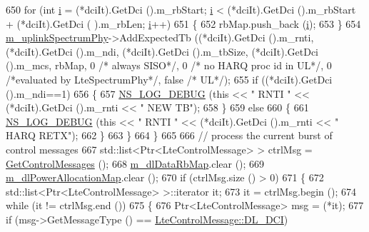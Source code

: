 \begin{DoxyCode}
650           \textcolor{keywordflow}{for} (\textcolor{keywordtype}{int} \hyperlink{bernuolliDistribution_8m_a6f6ccfcf58b31cb6412107d9d5281426}{i} = (*dciIt).GetDci ().m\_rbStart; \hyperlink{bernuolliDistribution_8m_a6f6ccfcf58b31cb6412107d9d5281426}{i} < (*dciIt).GetDci ().m\_rbStart + (*dciIt).GetDci (
      ).m\_rbLen; \hyperlink{bernuolliDistribution_8m_a6f6ccfcf58b31cb6412107d9d5281426}{i}++)
651             \{
652               rbMap.push\_back (\hyperlink{bernuolliDistribution_8m_a6f6ccfcf58b31cb6412107d9d5281426}{i});
653             \}
654           \hyperlink{classns3_1_1LtePhy_addc3110b5a1f7b63c52f4ce8ca59c6cd}{m\_uplinkSpectrumPhy}->AddExpectedTb ((*dciIt).GetDci ().m\_rnti, (*dciIt).GetDci
       ().m\_ndi, (*dciIt).GetDci ().m\_tbSize, (*dciIt).GetDci ().m\_mcs, rbMap, 0 \textcolor{comment}{/* always SISO*/}, 0 \textcolor{comment}{/* no HARQ
       proc id in UL*/}, 0 \textcolor{comment}{/*evaluated by LteSpectrumPhy*/}, \textcolor{keyword}{false} \textcolor{comment}{/* UL*/});
655           \textcolor{keywordflow}{if} ((*dciIt).GetDci ().m\_ndi==1)
656             \{
657               \hyperlink{group__logging_ga413f1886406d49f59a6a0a89b77b4d0a}{NS\_LOG\_DEBUG} (\textcolor{keyword}{this} << \textcolor{stringliteral}{" RNTI "} << (*dciIt).GetDci ().m\_rnti << \textcolor{stringliteral}{" NEW TB"});
658             \}
659           \textcolor{keywordflow}{else}
660             \{
661               \hyperlink{group__logging_ga413f1886406d49f59a6a0a89b77b4d0a}{NS\_LOG\_DEBUG} (\textcolor{keyword}{this} << \textcolor{stringliteral}{" RNTI "} << (*dciIt).GetDci ().m\_rnti << \textcolor{stringliteral}{" HARQ RETX"});
662             \}
663         \}
664     \}
665 
666   \textcolor{comment}{// process the current burst of control messages}
667   std::list<Ptr<LteControlMessage> > ctrlMsg = \hyperlink{classns3_1_1LtePhy_acd957b791ce9b6181b05add134061a67}{GetControlMessages} ();
668   \hyperlink{classns3_1_1LteEnbPhy_a3fb8cd42886925222a259b135fa0c5e4}{m\_dlDataRbMap}.clear ();
669   \hyperlink{classns3_1_1LteEnbPhy_a9296f50cf6ecc1ced51fb5172e49834f}{m\_dlPowerAllocationMap}.clear ();
670   \textcolor{keywordflow}{if} (ctrlMsg.size () > 0)
671     \{
672       std::list<Ptr<LteControlMessage> >::iterator it;
673       it = ctrlMsg.begin ();
674       \textcolor{keywordflow}{while} (it != ctrlMsg.end ())
675         \{
676           Ptr<LteControlMessage> msg = (*it);
677           \textcolor{keywordflow}{if} (msg->GetMessageType () == \hyperlink{classns3_1_1LteControlMessage_a9f9798d5aa8ad40f6432285b4b06135ba9cd550d54eff16dc9f72579d925d72ff}{LteControlMessage::DL\_DCI})

\end{DoxyCode}
